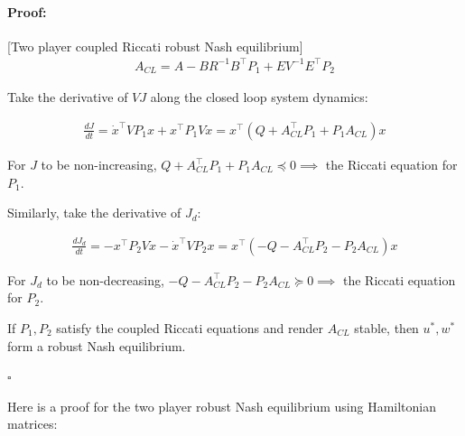 \documentclass[3p]{elsarticle}
\newenvironment{proof}{\paragraph{Proof:}}{\hfill$\square$}
\begin{document}
\begin{proof}[Two player coupled Riccati robust Nash equilibrium]
\begin{align} 
A_{CL} = A - BR^{-1}B^\top P_1 + EV^{-1}E^\top P_2
\end{align}

Take the derivative of $VJ$ along the closed loop system dynamics:

\begin{align}
\frac{dJ}{dt} = \dot{x}^\top VP_1 x + x^\top P_1V\dot{x} = x^\top (Q + A_{CL}^\top P_1 + P_1 A_{CL}) x
\end{align}

For $J$ to be non-increasing, $Q + A_{CL}^\top P_1 + P_1 A_{CL} \preceq 0 \implies$ the Riccati equation for $P_1$.

Similarly, take the derivative of $J_d$: 

\begin{align}
\frac{dJ_d}{dt} = -x^\top P_2 V \dot{x} - \dot{x}^\top V P_2 x = x^\top (-Q - A_{CL}^\top P_2 - P_2 A_{CL}) x
\end{align}

For $J_d$ to be non-decreasing, $-Q - A_{CL}^\top P_2 - P_2 A_{CL} \succeq 0 \implies$ the Riccati equation for $P_2$.

If $P_1, P_2$ satisfy the coupled Riccati equations and render $A_{CL}$ stable, then $u^*, w^*$ form a robust Nash equilibrium.

\end{proof}

Here is a proof for the two player robust Nash equilibrium using Hamiltonian matrices:
\end{document}
